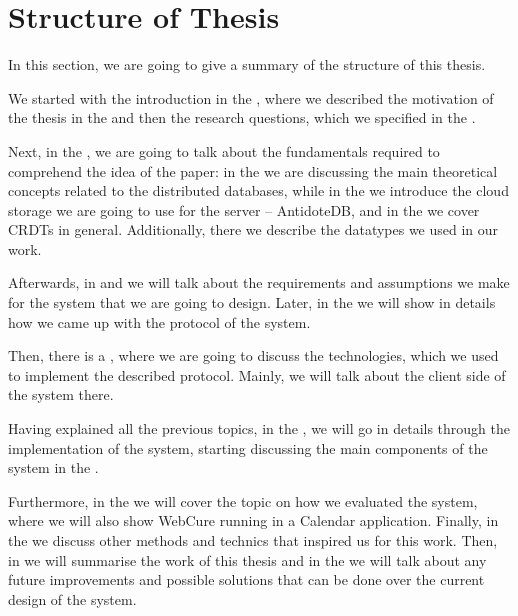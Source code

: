 \section{Structure of Thesis}

In this section, we are going to give a summary of the structure of this thesis. 

We started with the introduction in the , where we described the motivation of the thesis in the  and then the research questions, which we specified in the . 

Next, in the , we are going to talk about the fundamentals required to comprehend the idea of the paper: in the  we are discussing the main theoretical concepts related to the distributed databases, while in the  we introduce the cloud storage we are going to use for the server -- AntidoteDB, and in the  we cover CRDTs in general. Additionally, there we describe the datatypes we used in our work. 

Afterwards, in  and  we will talk about the requirements and assumptions we make for the system that we are going to design. Later, in the  we will show in details how we came up with the protocol of the system. 

Then, there is a , where we are going to discuss the technologies, which we used to implement the described protocol. Mainly, we will talk about the client side of the system there.

Having explained all the previous topics, in the , we will go in details through the implementation of the system, starting discussing the main components of the system in the .

Furthermore, in the  we will cover the topic on how we evaluated the system, where we will also show WebCure running in a Calendar application. Finally, in the  we discuss other methods and technics that inspired us for this work. Then, in  we will summarise the work of this thesis and in the  we will talk about any future improvements and possible solutions that can be done over the current design of the system. 